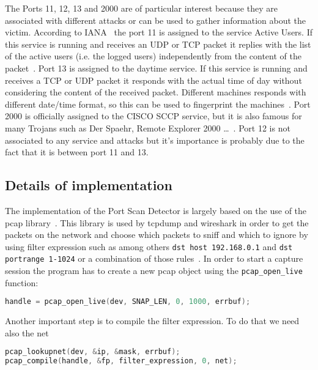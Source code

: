 The Ports 11, 12, 13 and 2000 are of particular interest because they are associated with different attacks or can be used
to gather information about the victim.
According to IANA~\cite{IANAPORTS} the port 11 is assigned to the service Active Users. If this service is running and
receives an UDP or TCP packet it replies with the list of the active users (i.e. the logged users) independently from the content of the packet~\cite{systat}.
Port 13 is assigned to the daytime service. If this service is running and receives a TCP or UDP packet it responds with the actual time of day without considering
the content of the received packet. Different machines responds with different date/time format, so this can be used to fingerprint the machines~\cite{portDetails}.
Port 2000 is officially assigned to the CISCO SCCP service, but it is also famous for 
many Trojans such as Der Spaehr, Remote Explorer 2000 \dots ~\cite{portDetails}.
Port 12 is not associated to any service and attacks but it's importance is probably due to the fact that it is between port 11 and 13.

\subsection{Details of implementation}
The implementation of the Port Scan Detector is largely based on the use of the pcap library~\cite{pcaptcpdump}.
This library is used by tcpdump and wireshark in order to get  the packets on the network and choose 
which packets to sniff and which to ignore by using filter expression such as among others \lstinline!dst host 192.168.0.1! and \lstinline!dst portrange 1-1024!
or a combination of those rules~\cite{pcapFilterRules}.
In order to start a capture session the program has to create a new pcap object using the \lstinline!pcap_open_live! function:
\begin{lstlisting}[frame= single, language=C, caption={Create a new pcap handler.}, label=lst:open_live]
handle = pcap_open_live(dev, SNAP_LEN, 0, 1000, errbuf);
\end{lstlisting}
Another important step is to compile the filter expression. To do that we need also the net 
\begin{lstlisting}[frame= single, language=C, caption=Pcap functions called to start getting the packets on the network (Error handling omitted).]
pcap_lookupnet(dev, &ip, &mask, errbuf);
pcap_compile(handle, &fp, filter_expression, 0, net);
\end{lstlisting}


